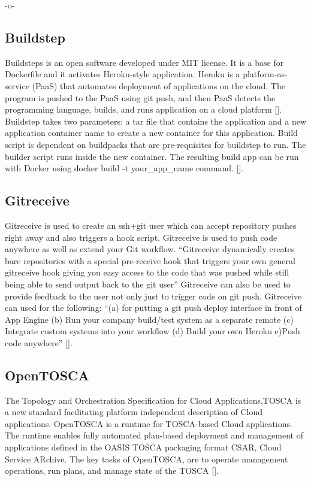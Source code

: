      -o-
     
\subsection{Buildstep}
     
Buildsteps is an open software developed under MIT license.  It is a
base for Dockerfile and it activates Heroku-style application. Heroku
is a platform-as-service (PaaS) that automates deployment of
applications on the cloud. The program is pushed to the PaaS using git
push, and then PaaS detects the programming language, builds, and runs
application on a cloud platform [\cite{plassnig15}].  Buildstep takes
two parameters: a tar file that contains the application and a new
application container name to create a new container for this
application. Build script is dependent on buildpacks that are
pre-requisites for buildstep to run. The builder script runs inside
the new container.  The resulting build app can be run with Docker
using docker build -t your\_app\_name
command. [\cite{github-buildstep}].

\subsection{Gitreceive}

Gitreceive is used to create an ssh+git user which can accept
repository pushes right away and also triggers a hook
script. Gitreceive is used to push code anywhere as well as extend
your Git workflow. ``Gitreceive dynamically creates bare repositories
with a special pre-receive hook that triggers your own general
gitreceive hook giving you easy access to the code that was pushed
while still being able to send output back to the git user''
Gitreceive can also be used to provide feedback to the user not only
just to trigger code on git push.  Gitreceive can used for the
following: ``(a) for putting a git push deploy interface in front of
App Engine (b) Run your company build/test system as a separate remote
(c) Integrate custom systems into your workflow (d) Build your own
Heroku e)Push code anywhere'' [\cite{lindsay2016}].
     
\subsection{OpenTOSCA}

The Topology and Orchestration Specification for Cloud
Applications,TOSCA is a new standard facilitating platform independent
description of Cloud applications. OpenTOSCA is a runtime for
TOSCA-based Cloud applications. The runtime enables fully automated
plan-based deployment and management of applications defined in the
OASIS TOSCA packaging format CSAR, Cloud Service ARchive.  The key
tasks of OpenTOSCA, are to operate management operations, run plans,
and manage state of the TOSCA [\cite{openTOSCA-paper}].
     
